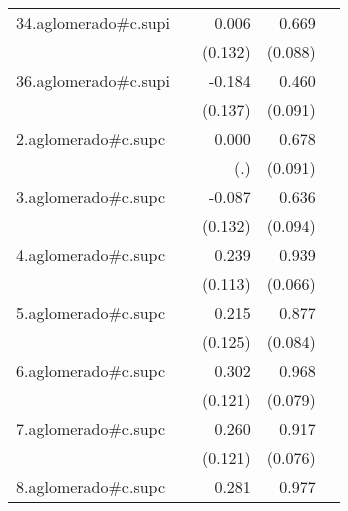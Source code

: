 {\begin{longtable}{l*{4}{D{.}{.}{-1}}}
\addlinespace
34.aglomerado#c.supi&                     &       0.006         &       0.669\sym{***}&                     \\
            &                     &     (0.132)         &     (0.088)         &                     \\
\addlinespace
36.aglomerado#c.supi&                     &      -0.184         &       0.460\sym{***}&                     \\
            &                     &     (0.137)         &     (0.091)         &                     \\
\addlinespace
2.aglomerado#c.supc&                     &       0.000         &       0.678\sym{***}&                     \\
            &                     &         (.)         &     (0.091)         &                     \\
\addlinespace
3.aglomerado#c.supc&                     &      -0.087         &       0.636\sym{***}&                     \\
            &                     &     (0.132)         &     (0.094)         &                     \\
\addlinespace
4.aglomerado#c.supc&                     &       0.239\sym{*}  &       0.939\sym{***}&                     \\
            &                     &     (0.113)         &     (0.066)         &                     \\
\addlinespace
5.aglomerado#c.supc&                     &       0.215         &       0.877\sym{***}&                     \\
            &                     &     (0.125)         &     (0.084)         &                     \\
\addlinespace
6.aglomerado#c.supc&                     &       0.302\sym{*}  &       0.968\sym{***}&                     \\
            &                     &     (0.121)         &     (0.079)         &                     \\
\addlinespace
7.aglomerado#c.supc&                     &       0.260\sym{*}  &       0.917\sym{***}&                     \\
            &                     &     (0.121)         &     (0.076)         &                     \\
\addlinespace
8.aglomerado#c.supc&                     &       0.281\sym{*}  &       0.977\sym{***}&                     \\

\end{longtable}}
